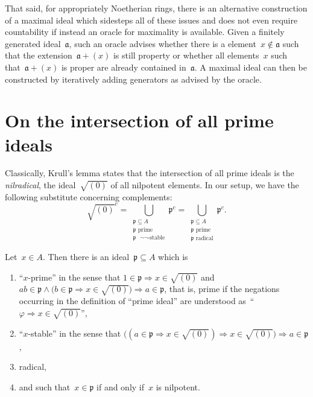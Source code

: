 \documentclass[envcountsect,envcountsame,runningheads]{llncs}
\newcommand{\aaa}{\mathfrak{a}}
\newcommand{\ppp}{\mathfrak{p}}
\renewcommand{\_}{\mathpunct{.}\,}
\begin{document}
That said, for appropriately Noetherian rings, there is an alternative
construction of a maximal ideal which sidesteps all of these issues and does
not even require countability if instead an oracle for maximality is available.
Given a finitely generated ideal~$\aaa$, such an oracle advises whether there is a
element~$x \not\in \aaa$ such that the extension~$\aaa + (x)$ is still property
or whether all elements~$x$ such that~$\aaa + (x)$ is proper are already
contained in~$\aaa$. A maximal ideal can then be constructed by iteratively
adding generators as advised by the oracle.~\cite{XXX}


\section{On the intersection of all prime ideals}
\label{sect:krull}

Classically, Krull's lemma states that the intersection of all prime ideals is the
\emph{nilradical}, the ideal~$\sqrt{(0)}$ of all nilpotent elements. In our
setup, we have the following substitute concerning complements:
\[ \sqrt{(0)}^c =
  \bigcup_{\substack{\text{$\ppp \subseteq A$}\\\text{$\ppp$ prime}\\\text{$\ppp$ $\neg\neg$-stable}}} \ppp^c =
  \bigcup_{\substack{\text{$\ppp \subseteq A$}\\\text{$\ppp$ prime}\\\text{$\ppp$ radical}}} \ppp^c. \]

\begin{lemma}\label{lemma:x-prime}
Let~$x \in A$. Then there is an ideal~$\ppp \subseteq A$ which is
\begin{enumerate}
\item ``$x$-prime'' in the sense that
$1 \in \ppp \Rightarrow x \in \sqrt{(0)}$ and
$ab \in \ppp \wedge \bigl(b \in \ppp \Rightarrow x \in \sqrt{(0)}\bigr) \Longrightarrow
   a \in \ppp$,
that is, prime if the negations occurring in the definition of ``prime ideal''
are understood as~``$\varphi \Rightarrow x \in \sqrt{(0)}$'',
\item ``$x$-stable'' in the sense that
$\bigl((a \in \ppp \Rightarrow x \in \sqrt{(0)}) \Rightarrow x \in \sqrt{(0)}\bigr)
  \Rightarrow a \in \ppp$,
\item radical,
\item and such that~$x \in \ppp$ if and only if~$x$ is nilpotent.
\end{enumerate}
\end{lemma}
\end{document}
